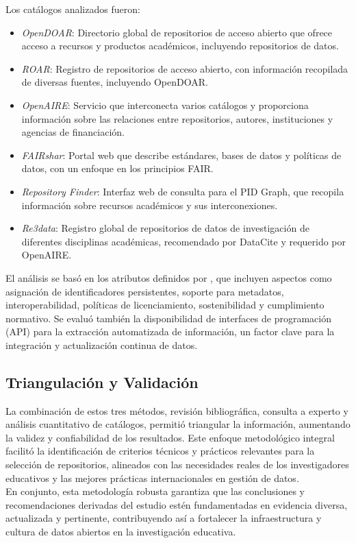 \documentclass[runningheads]{llncs}
\begin{document}
Los catálogos analizados fueron:
\begin{itemize}
    \item \emph{OpenDOAR}: Directorio global de repositorios de acceso abierto que ofrece acceso a recursos y productos académicos, incluyendo repositorios de datos.
    \item \emph{ROAR}: Registro de repositorios de acceso abierto, con información recopilada de diversas fuentes, incluyendo OpenDOAR.
    \item \emph{OpenAIRE}: Servicio que interconecta varios catálogos y proporciona información sobre las relaciones entre repositorios, autores, instituciones y agencias de financiación.
    \item \emph{FAIRshar}: Portal web que describe estándares, bases de datos y políticas de datos, con un enfoque en los principios FAIR.
    \item \emph{Repository Finder}: Interfaz web de consulta para el PID Graph, que recopila información sobre recursos académicos y sus interconexiones.
    \item \emph{Re3data}: Registro global de repositorios de datos de investigación de diferentes disciplinas académicas, recomendado por DataCite y requerido por OpenAIRE.
\end{itemize}

El análisis se basó en los atributos definidos por \cite{witt_2024_11221855}, que incluyen aspectos como asignación de identificadores persistentes, soporte para metadatos, interoperabilidad, políticas de licenciamiento, sostenibilidad y cumplimiento normativo. Se evaluó también la disponibilidad de interfaces de programación (API) para la extracción automatizada de información, un factor clave para la integración y actualización continua de datos.\\

\subsection{Triangulación y Validación}
La combinación de estos tres métodos, revisión bibliográfica, consulta a experto y análisis cuantitativo de catálogos, permitió triangular la información, aumentando la validez y confiabilidad de los resultados. Este enfoque metodológico integral facilitó la identificación de criterios técnicos y prácticos relevantes para la selección de repositorios, alineados con las necesidades reales de los investigadores educativos y las mejores prácticas internacionales en gestión de datos.\\
En conjunto, esta metodología robusta garantiza que las conclusiones y recomendaciones derivadas del estudio estén fundamentadas en evidencia diversa, actualizada y pertinente, contribuyendo así a fortalecer la infraestructura y cultura de datos abiertos en la investigación educativa.\\
\end{document}
